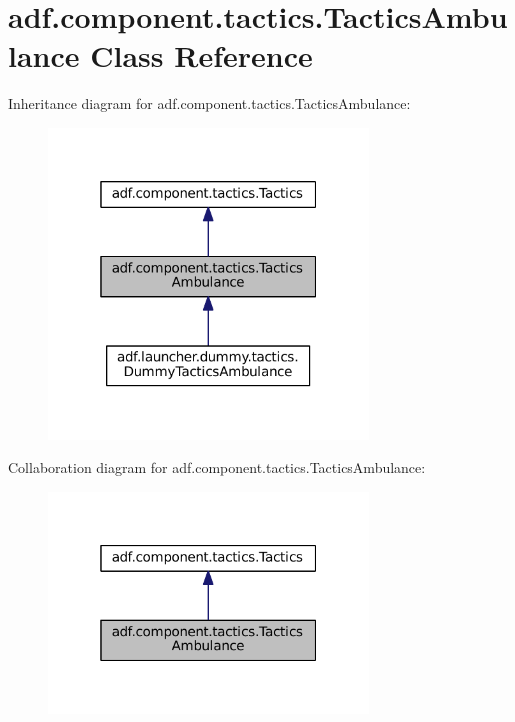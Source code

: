 \hypertarget{classadf_1_1component_1_1tactics_1_1TacticsAmbulance}{}\section{adf.\+component.\+tactics.\+Tactics\+Ambulance Class Reference}
\label{classadf_1_1component_1_1tactics_1_1TacticsAmbulance}


Inheritance diagram for adf.\+component.\+tactics.\+Tactics\+Ambulance\+:
\nopagebreak
\begin{figure}[H]
\begin{center}
\leavevmode
\includegraphics[width=241pt]{classadf_1_1component_1_1tactics_1_1TacticsAmbulance__inherit__graph}
\end{center}
\end{figure}


Collaboration diagram for adf.\+component.\+tactics.\+Tactics\+Ambulance\+:
\nopagebreak
\begin{figure}[H]
\begin{center}
\leavevmode
\includegraphics[width=241pt]{classadf_1_1component_1_1tactics_1_1TacticsAmbulance__coll__graph}
\end{center}
\end{figure}
